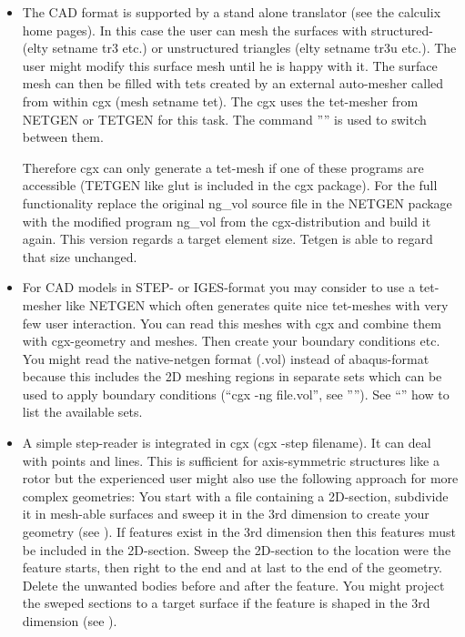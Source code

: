 \documentclass{article}
\begin{document}
\begin{appendix}
\begin{itemize}

\item The CAD format is supported by a stand alone translator (see the calculix home pages). In this case the user can mesh the surfaces with structured- \cite{Coons} (elty setname tr3 etc.) or unstructured triangles \cite{mesh2d} (elty setname tr3u etc.). The user might modify this surface mesh until he is happy with it. The surface mesh can then be filled with tets created by an external auto-mesher called from within cgx (mesh setname tet). The cgx uses the tet-mesher from NETGEN \cite{NETGEN} or TETGEN \cite{TETGEN} for this task. The command '''' is used to switch between them.

Therefore cgx can only generate a tet-mesh if one of these programs are accessible (TETGEN like glut is included in the cgx package). For the full functionality replace the original ng\_vol source file in the NETGEN package with the modified program ng\_vol from the cgx-distribution and build it again. This version regards a target element size. Tetgen is able to regard that size unchanged.

\item For CAD models in STEP- or IGES-format you may consider to use a tet-mesher like NETGEN \cite{NETGEN} which often generates quite nice tet-meshes with very few user interaction. You can read this meshes with cgx and combine them with cgx-geometry and meshes. Then create your boundary conditions etc. You might read the native-netgen format (.vol) instead of abaqus-format because this includes the 2D meshing regions in separate sets which can be used to apply boundary conditions (``cgx -ng file.vol'', see ''''). See ``'' how to list the available sets.

\item A simple step-reader is integrated in cgx (cgx -step filename). It can deal with points and lines. This is sufficient for axis-symmetric structures like a rotor but the experienced user might also use the following approach for more complex geometries: You start with a file containing a 2D-section, subdivide it in mesh-able surfaces and sweep it in the 3rd dimension to create your geometry (see ). If features exist in the 3rd dimension then this features must be included in the 2D-section. Sweep the 2D-section to the location were the feature starts, then right to the end and at last to the end of the geometry. Delete the unwanted bodies before and after the feature. You might project the sweped sections to a target surface if the feature is shaped in the 3rd dimension (see ).


\end{itemize}
\end{appendix}
\end{document}
